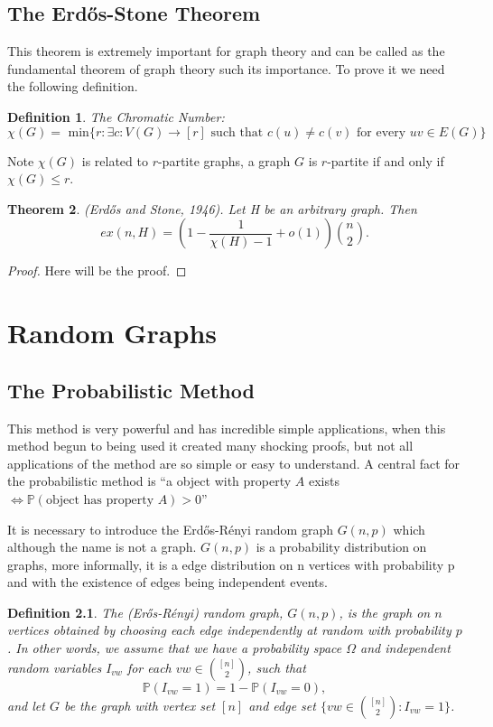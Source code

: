 \documentclass[12pt,twoside,a4paper]{book}
\numberwithin{equation}{section}
\newtheorem{theorem}             {Theorem}[section]
\newtheorem{definition}	[theorem] {Definition}
\theoremstyle{remark}
\begin{document}
\section{The Erd\H{o}s-Stone Theorem}
This theorem is extremely important for graph theory and can be called as the fundamental theorem of graph theory such its importance. To prove it we need the following definition.
\begin{definition} The Chromatic Number:
$$\chi(G) = \text{ min}\{r: \exists c : V(G) \rightarrow [r] \text{ such that } c(u) \neq c(v) \text{ for every } uv \in E(G)\}$$ 
\end{definition}

Note $\chi(G)$ is related to $r$-partite graphs, a graph $G$ is $r$-partite if and only if $\chi(G) \leq r$.


\begin{theorem}
(Erd\H{o}s and Stone, 1946). Let H be an arbitrary graph. Then
$$ ex(n,H) = \left(1-\frac{1}{\chi (H)-1} + o(1)\right) \binom{n}{2}.$$ 
\end{theorem}

\begin{proof}

Here will be the proof.

\end{proof}

\chapter{Random Graphs}
\section{The Probabilistic Method}
This method is very powerful and has incredible simple applications, when this method begun to being used it created many shocking proofs, but not all applications of the method are so simple or easy to understand. A central fact for the probabilistic method is ``a object with property $ A$ exists $\iff  \mathbb{P}(\text{object has property }A)>0$''

It is necessary to introduce the Erd\H{o}s-Rényi random graph $G(n,p)$ which although the name is not a graph. $G(n,p)$ is a probability distribution on graphs, more informally, it is a edge distribution on n vertices with probability p and with the existence of edges being independent events.

\begin{definition}\label{def:randomgraph}
The (Er\H{o}s-Rényi) random graph, $G(n,p)$, is the graph on $n$ vertices obtained by choosing each edge independently at random with probability $p$. In other words, we assume that we have a probability space $\Omega$ and independent random variables $I_{vw}$ for each $vw \in \binom{[n]}{2}$, such that
$$\mathbb{P}(I_{vw} = 1) = 1 - \mathbb{P}(I_{vw} = 0),$$ 
and let $G$ be the graph with vertex set $[n]$ and edge set $\{vw \in \binom{[n]}{2}: I_{vw} = 1\}$. 

\end{definition}
\end{document}
